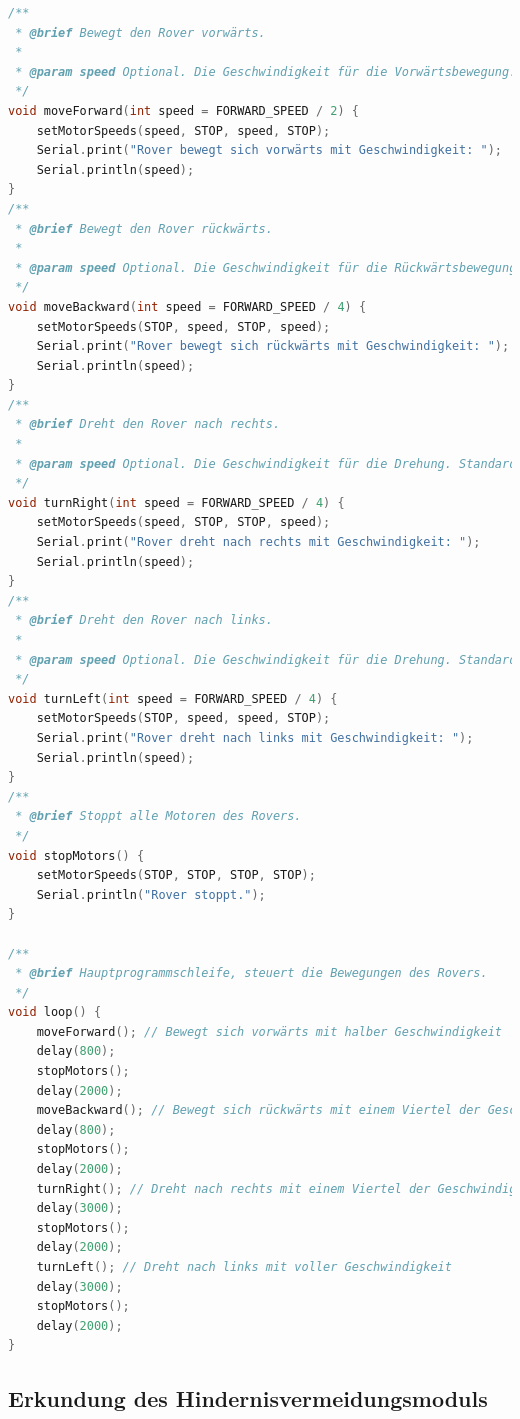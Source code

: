 \documentclass{vorlage-design-main}
\begin{document}
\begin{lstlisting}[language={C++}]
/**
 * @brief Bewegt den Rover vorwärts.
 * 
 * @param speed Optional. Die Geschwindigkeit für die Vorwärtsbewegung. Standard ist die Hälfte der maximalen Geschwindigkeit.
 */
void moveForward(int speed = FORWARD_SPEED / 2) {
    setMotorSpeeds(speed, STOP, speed, STOP);
    Serial.print("Rover bewegt sich vorwärts mit Geschwindigkeit: ");
    Serial.println(speed);
}
/**
 * @brief Bewegt den Rover rückwärts.
 * 
 * @param speed Optional. Die Geschwindigkeit für die Rückwärtsbewegung. Standard ist ein Viertel der maximalen Geschwindigkeit.
 */
void moveBackward(int speed = FORWARD_SPEED / 4) {
    setMotorSpeeds(STOP, speed, STOP, speed);
    Serial.print("Rover bewegt sich rückwärts mit Geschwindigkeit: ");
    Serial.println(speed);
}
/**
 * @brief Dreht den Rover nach rechts.
 * 
 * @param speed Optional. Die Geschwindigkeit für die Drehung. Standard ist ein Viertel der maximalen Geschwindigkeit.
 */
void turnRight(int speed = FORWARD_SPEED / 4) {
    setMotorSpeeds(speed, STOP, STOP, speed);
    Serial.print("Rover dreht nach rechts mit Geschwindigkeit: ");
    Serial.println(speed);
}
/**
 * @brief Dreht den Rover nach links.
 * 
 * @param speed Optional. Die Geschwindigkeit für die Drehung. Standard ist die maximale Geschwindigkeit.
 */
void turnLeft(int speed = FORWARD_SPEED / 4) {
    setMotorSpeeds(STOP, speed, speed, STOP);
    Serial.print("Rover dreht nach links mit Geschwindigkeit: ");
    Serial.println(speed);
}
/**
 * @brief Stoppt alle Motoren des Rovers.
 */
void stopMotors() {
    setMotorSpeeds(STOP, STOP, STOP, STOP);
    Serial.println("Rover stoppt.");
}

/**
 * @brief Hauptprogrammschleife, steuert die Bewegungen des Rovers.
 */
void loop() {
    moveForward(); // Bewegt sich vorwärts mit halber Geschwindigkeit
    delay(800);
    stopMotors();
    delay(2000);
    moveBackward(); // Bewegt sich rückwärts mit einem Viertel der Geschwindigkeit
    delay(800);
    stopMotors();
    delay(2000);
    turnRight(); // Dreht nach rechts mit einem Viertel der Geschwindigkeit
    delay(3000);
    stopMotors();
    delay(2000);
    turnLeft(); // Dreht nach links mit voller Geschwindigkeit
    delay(3000);
    stopMotors();
    delay(2000);
}
\end{lstlisting}

\hypertarget{erkundung-des-hindernisvermeidungsmoduls}{%
\subsection{Erkundung des
Hindernisvermeidungsmoduls}\label{erkundung-des-hindernisvermeidungsmoduls}}
\end{document}
